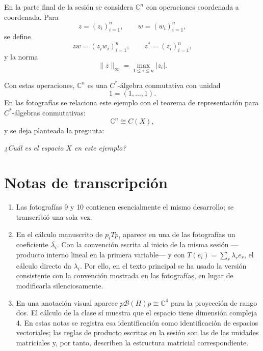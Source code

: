 \documentclass[11pt]{article}
\newcommand{\C}{\mathbb{C}}
\newcommand{\BH}{\mathcal{B}(H)}
\begin{document}
En la parte final de la sesión se considera $\C^n$ con operaciones coordenada a
coordenada. Para
\[
z=(z_i)_{i=1}^n,
\qquad
w=(w_i)_{i=1}^n,
\]
se define
\[
zw=(z_iw_i)_{i=1}^n,
\qquad
z^*=(\overline{z_i})_{i=1}^n,
\]
y la norma
\[
\|z\|_\infty=\max_{1\le i\le n}|z_i|.
\]

Con estas operaciones, $\C^n$ es una $C^*$-álgebra conmutativa con unidad
\[
1=(1,\ldots,1).
\]
En las fotografías se relaciona este ejemplo con el teorema de representación
para $C^*$-álgebras conmutativas:
\[
\C^n\cong C(X),
\]
y se deja planteada la pregunta:
\begin{center}
\emph{¿Cuál es el espacio $X$ en este ejemplo?}
\end{center}

\section*{Notas de transcripción}

\begin{enumerate}[leftmargin=2.2em]
\item Las fotografías 9 y 10 contienen esencialmente el mismo desarrollo; se
transcribió una sola vez.

\item En el cálculo manuscrito de $p_iTp_i$ aparece en una de las fotografías un
coeficiente $\overline{\lambda_i}$. Con la convención escrita al inicio de la
misma sesión ---producto interno lineal en la primera variable--- y con
$T(e_i)=\sum_r\lambda_r e_r$, el cálculo directo da $\lambda_i$. Por ello, en el
texto principal se ha usado la versión consistente con la convención mostrada en
las fotografías, en lugar de modificarla silenciosamente.

\item En una anotación visual aparece $p\BH p\cong\C^4$ para la proyección de
rango dos. El cálculo de la clase sí muestra que el espacio tiene dimensión
compleja $4$. En estas notas se registra esa identificación como identificación
de espacios vectoriales; las reglas de producto escritas en la sesión son las de
las unidades matriciales y, por tanto, describen la estructura matricial
correspondiente.
\end{enumerate}
\end{document}
